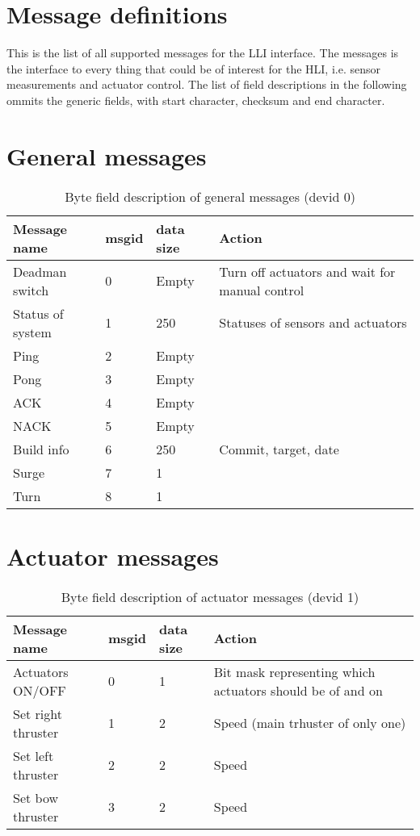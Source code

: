\section{Message definitions}
This is the list of all supported messages for the LLI interface. The messages is the interface to every thing that could be of interest for the HLI, i.e. sensor measurements and actuator control. The list of field descriptions in the following ommits the generic fields, with start character, checksum and end character.

\section{General messages}

\begin{table}[h]
	\centering
	\begin{tabular}{llll}
		\toprule
		\textbf{Message name}  & \textbf{msgid} & \textbf{data size} & \textbf{Action}\\
		\midrule
		Deadman switch & 0 & Empty & Turn off actuators and wait for manual control \\
		Status of system & 1 & 250 & Statuses of sensors and actuators \\
		Ping & 2 & Empty \\
		Pong & 3& Empty \\
		ACK & 4 & Empty\\
		NACK & 5 & Empty\\
		Build info & 6 & 250 & Commit, target, date\\
		Surge & 7 & 1 &\\
		Turn & 8 & 1 &\\
		\bottomrule
	\end{tabular}
	\caption{Byte field description of general messages (devid 0)}
	\label{tab:ack}
\end{table}


\section{Actuator messages}
\begin{table}[h]
	\centering
	\begin{tabular}{llll}
		\toprule
		\textbf{Message name}  & \textbf{msgid} & \textbf{data size} & \textbf{Action}\\
		\midrule
		Actuators ON/OFF & 0 & 1 & Bit mask representing which actuators should be of and on\\
		Set right thruster & 1 & 2 & Speed (main trhuster of only one) \\
		Set left thruster & 2 & 2 & Speed \\
		Set bow thruster & 3 & 2 & Speed \\
		\bottomrule
	\end{tabular}
	\caption{Byte field description of actuator messages (devid 1)}
	\label{tab:ack}
\end{table}

